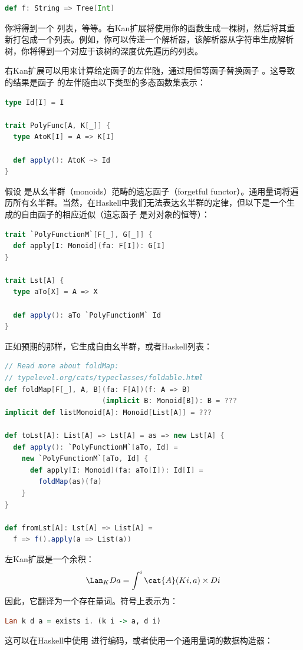 \begin{lstlisting}[language=Scala]
def f: String => Tree[Int]
\end{lstlisting}
你将得到一个  列表，等等。右Kan扩展将使用你的函数生成一棵树，然后将其重新打包成一个列表。例如，你可以传递一个解析器，该解析器从字符串生成解析树，你将得到一个对应于该树的深度优先遍历的列表。

右Kan扩展可以用来计算给定函子的左伴随，通过用恒等函子替换函子 。这导致的结果是函子  的左伴随由以下类型的多态函数集表示：

\begin{lstlisting}[language=Scala]
type Id[I] = I

trait PolyFunc[A, K[_]] {
  type AtoK[I] = A => K[I]

  def apply(): AtoK ~> Id
}
\end{lstlisting}
假设  是从幺半群（monoids）范畴的遗忘函子（forgetful functor）。通用量词将遍历所有幺半群。当然，在Haskell中我们无法表达幺半群的定律，但以下是一个生成的自由函子的相应近似（遗忘函子  是对对象的恒等）：

\begin{lstlisting}[language=Scala]
trait `PolyFunctionM`[F[_], G[_]] {
  def apply[I: Monoid](fa: F[I]): G[I]
}

trait Lst[A] {
  type aTo[X] = A => X

  def apply(): aTo `PolyFunctionM` Id
}
\end{lstlisting}
正如预期的那样，它生成自由幺半群，或者Haskell列表：

\begin{lstlisting}[language=Scala]
// Read more about foldMap:
// typelevel.org/cats/typeclasses/foldable.html
def foldMap[F[_], A, B](fa: F[A])(f: A => B)
                       (implicit B: Monoid[B]): B = ???
implicit def listMonoid[A]: Monoid[List[A]] = ???

def toLst[A]: List[A] => Lst[A] = as => new Lst[A] {
  def apply(): `PolyFunctionM`[aTo, Id] =
    new `PolyFunctionM`[aTo, Id] {
      def apply[I: Monoid](fa: aTo[I]): Id[I] =
        foldMap(as)(fa)
    }
}

def fromLst[A]: Lst[A] => List[A] =
  f => f().apply(a => List(a))
\end{lstlisting}
左Kan扩展是一个余积：
\[\Lan_{K}D a = \int^i \cat{A}(K i, a)\times{}D i\]
因此，它翻译为一个存在量词。符号上表示为：

\begin{lstlisting}[language=Haskell]
  Lan k d a = exists i. (k i -> a, d i)
\end{lstlisting}
这可以在Haskell中使用  进行编码，或者使用一个通用量词的数据构造器：

